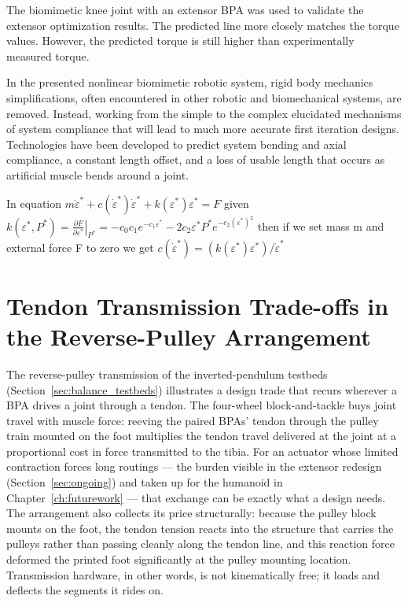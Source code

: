 The biomimetic knee joint with an extensor BPA was used to validate the extensor optimization results. The predicted line more closely matches the torque values. However, the predicted torque is still higher than experimentally measured torque.


In the presented nonlinear biomimetic robotic system, rigid body mechanics simplifications, often encountered in other robotic and biomechanical systems, are removed. Instead, working from the simple to the complex elucidated mechanisms of system compliance that will lead to much more accurate first iteration designs. Technologies have been developed to predict system bending and axial compliance, a constant length offset, and a loss of usable length that occurs as artificial muscle bends around a joint. 

In equation $m\ddot \varepsilon^* + c (\dot \varepsilon^* ) \dot \varepsilon^* + k ( \varepsilon^* ) \varepsilon^* = F$ given $k(\varepsilon^{*}, P^{*})
= \left.\frac{\partial F}{\partial \varepsilon^{*}}\right|_{P^{*}}
= -c_{0}c_{1}e^{-c_{1}\varepsilon^{*}}
  - 2c_{2}\varepsilon^{*}P^{*}e^{-c_{2}(\varepsilon^{*})^{2}}$
then if we set mass m and external force F to zero we get
$c (\dot \varepsilon^* ) = (k ( \varepsilon^* ) \varepsilon^*)/\dot \varepsilon^*$


\section{Tendon Transmission Trade-offs in the Reverse-Pulley Arrangement}\label{sec:disc_transmission}

The reverse-pulley transmission of the inverted-pendulum testbeds (Section~\ref{sec:balance_testbeds}) \citep{bolen_balance_2024, bolen_selfbalancing_2024, bolen_selfbalancing_srs_2024} illustrates a design trade that recurs wherever a BPA drives a joint through a tendon. The four-wheel block-and-tackle buys joint travel with muscle force: reeving the paired BPAs' tendon through the pulley train mounted on the foot multiplies the tendon travel delivered at the joint at a proportional cost in force transmitted to the tibia. For an actuator whose limited contraction forces long routings --- the burden visible in the extensor redesign (Section~\ref{sec:ongoing}) and taken up for the humanoid in Chapter~\ref{ch:futurework} --- that exchange can be exactly what a design needs. The arrangement also collects its price structurally: because the pulley block mounts on the foot, the tendon tension reacts into the structure that carries the pulleys rather than passing cleanly along the tendon line, and this reaction force deformed the printed foot significantly at the pulley mounting location. Transmission hardware, in other words, is not kinematically free; it loads and deflects the segments it rides on.

